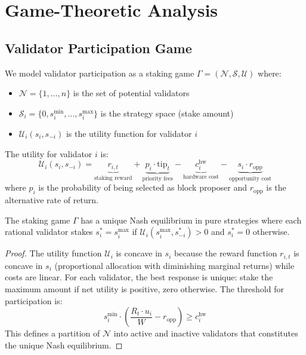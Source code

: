 \section{Game-Theoretic Analysis}
\label{sec:game}

\subsection{Validator Participation Game}

We model validator participation as a staking game $\Gamma = (\mathcal{N}, \mathcal{S}, \mathcal{U})$ where:
\begin{itemize}
    \item $\mathcal{N} = \{1, \ldots, n\}$ is the set of potential validators
    \item $\mathcal{S}_i = \{0, s_i^{\min}, \ldots, s_i^{\max}\}$ is the strategy space (stake amount)
    \item $\mathcal{U}_i(s_i, s_{-i})$ is the utility function for validator $i$
\end{itemize}

The utility for validator $i$ is:
\begin{equation}
    \mathcal{U}_i(s_i, s_{-i}) = \underbrace{r_{i,t}}_{\text{staking reward}} + \underbrace{p_i \cdot \text{tip}_t}_{\text{priority fees}} - \underbrace{c_i^{\text{hw}}}_{\text{hardware cost}} - \underbrace{s_i \cdot r_{\text{opp}}}_{\text{opportunity cost}}
\end{equation}
where $p_i$ is the probability of being selected as block proposer and $r_{\text{opp}}$ is the alternative rate of return.

\begin{theorem}
The staking game $\Gamma$ has a unique Nash equilibrium in pure strategies where each rational validator stakes $s_i^* = s_i^{\max}$ if $\mathcal{U}_i(s_i^{\max}, s_{-i}^*) > 0$ and $s_i^* = 0$ otherwise.
\end{theorem}

\begin{proof}
The utility function $\mathcal{U}_i$ is concave in $s_i$ because the reward function $r_{i,t}$ is concave in $s_i$ (proportional allocation with diminishing marginal returns) while costs are linear. For each validator, the best response is unique: stake the maximum amount if net utility is positive, zero otherwise. The threshold for participation is:
\begin{equation}
    s_i^{\min} \cdot \left(\frac{R_t \cdot u_i}{W} - r_{\text{opp}}\right) \geq c_i^{\text{hw}}
\end{equation}
This defines a partition of $\mathcal{N}$ into active and inactive validators that constitutes the unique Nash equilibrium.
\end{proof}

